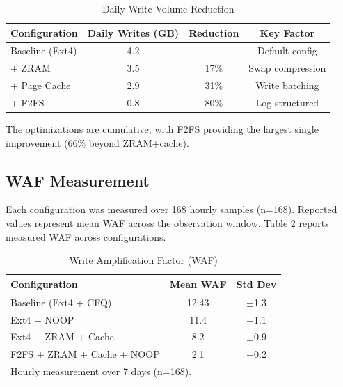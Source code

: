 \documentclass[conference]{IEEEtran}
\begin{document}
\begin{table}[h]
\caption{Daily Write Volume Reduction}
\begin{center}
\begin{tabular}{lccc}
\toprule
\textbf{Configuration} & \textbf{Daily Writes (GB)} & \textbf{Reduction} & \textbf{Key Factor} \\
\midrule
Baseline (Ext4) & 4.2 & --- & Default config \\
+ ZRAM & 3.5 & 17\% & Swap compression \\
+ Page Cache & 2.9 & 31\% & Write batching \\
+ F2FS & 0.8 & 80\% & Log-structured \\
\bottomrule
\end{tabular}
\end{center}
\label{fig:writes}
\end{table}

The optimizations are cumulative, with F2FS providing the largest single improvement (66\% beyond ZRAM+cache).

\subsection{WAF Measurement}

Each configuration was measured over 168 hourly samples (n=168). Reported values represent mean WAF across the observation window. Table \ref{tab:waf} reports measured WAF across configurations.

\begin{table}[h]
\caption{Write Amplification Factor (WAF)}
\begin{center}
\begin{tabular}{lcc}
\toprule
\textbf{Configuration} & \textbf{Mean WAF} & \textbf{Std Dev} \\
\midrule
Baseline (Ext4 + CFQ) & 12.43 & $\pm$1.3 \\
Ext4 + NOOP & 11.4 & $\pm$1.1 \\
Ext4 + ZRAM + Cache & 8.2 & $\pm$0.9 \\
F2FS + ZRAM + Cache + NOOP & 2.1 & $\pm$0.2 \\
\bottomrule
\multicolumn{3}{l}{\scriptsize Hourly measurement over 7 days (n=168).}
\end{tabular}
\end{center}
\label{tab:waf}
\end{table}
\end{document}
